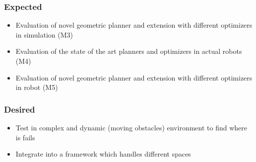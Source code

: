 \documentclass[rnd]{mas_proposal}
\begin{document}
\subsubsection*{Expected}
\begin{itemize}
    \item Evaluation of novel geometric planner and extension with different optimizers
in simulation (M3)
    \item Evaluation of the state of the art planners and optimizers in actual robots (M4)
    \item Evaluation of novel geometric planner and extension with different optimizers
in robot (M5)
\end{itemize}

\subsubsection*{Desired}
\begin{itemize}
    \item Test in complex and dynamic (moving obstacles) environment to find where is fails
    \item Integrate into a framework which handles different spaces
\end{itemize}


\nocite{*}

\end{document}
